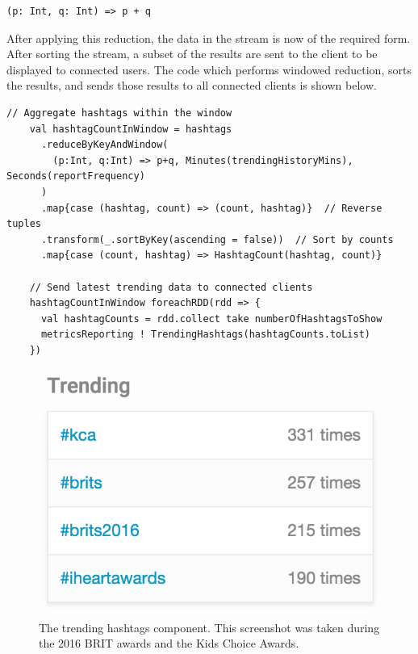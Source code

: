 \documentclass{l4proj}
\begin{document}
\begin{lstlisting}
(p: Int, q: Int) => p + q
\end{lstlisting}

After applying this reduction, the data in the stream is now of the required form. After sorting the stream, a subset of the results are sent to the client to be displayed to connected users. The code which performs windowed reduction, sorts the results, and sends those results to all connected clients is shown below.

\begin{lstlisting}[caption=Counting the hashtags used within a temporal window.]
    // Aggregate hashtags within the window
    val hashtagCountInWindow = hashtags
      .reduceByKeyAndWindow(
        (p:Int, q:Int) => p+q, Minutes(trendingHistoryMins), Seconds(reportFrequency)
      )
      .map{case (hashtag, count) => (count, hashtag)}  // Reverse tuples
      .transform(_.sortByKey(ascending = false))  // Sort by counts
      .map{case (count, hashtag) => HashtagCount(hashtag, count)}

    // Send latest trending data to connected clients
    hashtagCountInWindow foreachRDD(rdd => {
      val hashtagCounts = rdd.collect take numberOfHashtagsToShow
      metricsReporting ! TrendingHashtags(hashtagCounts.toList)
    })

\end{lstlisting}

\begin{figure}
\centering
\includegraphics[scale=0.75]{trending.png}
\caption{The trending hashtags component. This screenshot was taken during the 2016 BRIT awards and the Kids Choice Awards.}
\label{trending}
\end{figure}
                       
\end{document}

